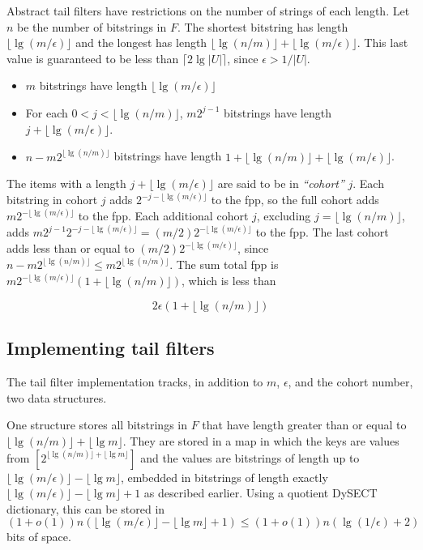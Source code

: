 \documentclass[11pt,letterpaper]{article}
\begin{document}

Abstract tail filters have restrictions on the number of strings of each length.
Let $n$ be the number of bitstrings in $F$.
The shortest bitstring has length $\lfloor \lg (m / \epsilon) \rfloor$ and the longest has length $\lfloor \lg (n/m) \rfloor + \lfloor \lg (m / \epsilon) \rfloor$.
This last value is guaranteed to be less than $\lceil 2 \lg |U| \rceil$, since $\epsilon > 1/|U|$.

\begin {itemize}
\item $m$ bitstrings have length $\lfloor \lg (m / \epsilon) \rfloor$
\item For each $0 < j < \lfloor \lg (n/m) \rfloor $, $m2^{j-1}$ bitstrings have length $j + \lfloor \lg (m / \epsilon) \rfloor$.
\item $n - m2^{\lfloor \lg (n/m) \rfloor}$ bitstrings have length $1 + \lfloor \lg (n/m) \rfloor  + \lfloor \lg (m / \epsilon) \rfloor$.
\end {itemize}

The items with a length $j + \lfloor \lg (m / \epsilon) \rfloor$ are said to be in {\em ``cohort''} $j$.
Each bitstring in cohort $j$ adds $2^{- j - \lfloor \lg (m / \epsilon) \rfloor}$ to the fpp, so the full cohort adds $m2^{- \lfloor \lg (m / \epsilon) \rfloor}$ to the fpp.
Each additional cohort $j$, excluding $j = \lfloor \lg (n/m) \rfloor$, adds $m 2^{j-1} 2^{-j - \lfloor \lg (m / \epsilon) \rfloor} = (m/2) 2^{-\lfloor \lg (m / \epsilon) \rfloor}$ to the fpp.
The last cohort adds less than or equal to $(m/2) 2^{-\lfloor \lg (m / \epsilon) \rfloor}$, since $n - m 2^{\lfloor \lg (n/m) \rfloor} \leq m 2^{\lfloor \lg(n/m)\rfloor}$.
The sum total fpp is $m 2^{- \lfloor \lg (m / \epsilon) \rfloor} (1 + \lfloor \lg (n/m) \rfloor)$, which is less than

\begin{equation}
  2 \epsilon (1 + \lfloor \lg (n/m) \rfloor)
\end{equation}

\subsection{Implementing tail filters}

The tail filter implementation tracks, in addition to $m$, $\epsilon$, and the cohort number, two data structures.

One structure stores all bitstrings in $F$ that have length greater than or equal to $\lfloor \lg (n/m) \rfloor + \lfloor \lg m \rfloor$.
They are stored in a map in which the keys are values from $[2^{\lfloor \lg (n/m) \rfloor + \lfloor \lg m \rfloor}]$ and the values are bitstrings of length up to $\lfloor \lg (m/\epsilon) \rfloor - \lfloor \lg m \rfloor$, embedded in bitstrings of length exactly $\lfloor \lg (m/\epsilon) \rfloor - \lfloor \lg m \rfloor + 1$ as described earlier.
Using a quotient DySECT dictionary, this can be stored in $(1 + o(1))n(\lfloor \lg (m/\epsilon) \rfloor - \lfloor \lg m \rfloor + 1) \leq (1+o(1))n(\lg (1/\epsilon) + 2)$ bits of space.
\end{document}
